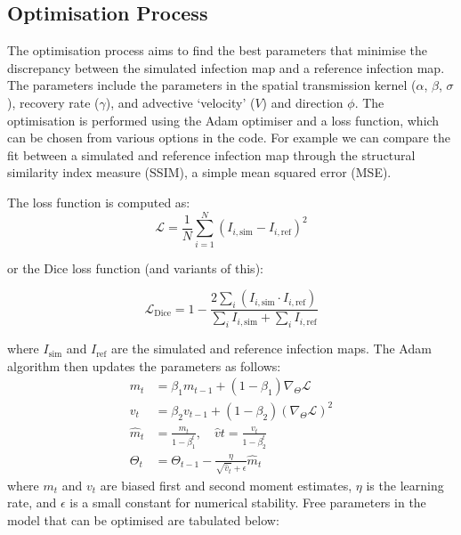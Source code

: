\documentclass[12pt]{article}
\begin{document}
\subsection{Optimisation Process}
The optimisation process aims to find the best parameters that minimise the discrepancy between the simulated infection map and a reference infection map. The parameters include the parameters in the spatial transmission  kernel ($\alpha$, $\beta$, $\sigma$), recovery rate ($\gamma$), and advective `velocity' ($V$) and direction $\phi$. The optimisation is performed using the Adam optimiser and a loss function, which can be chosen from various options in the code. For example we can compare the fit between a simulated and reference infection map through the structural similarity index measure (SSIM),  a simple mean squared error (MSE).

The loss function is computed as:
\[
\mathcal{L}= \frac{1}{N} \sum_{i=1}^{N} (I_{i, \text{sim}} - I_{i, \text{ref}})^2
\]

or the Dice loss function (and variants of this):

\[
\mathcal{L}_{\text{Dice}} = 1 - \frac{2 \sum_{i} (I_{i, \text{sim}} \cdot I_{i, \text{ref}})}{\sum_{i} I_{i, \text{sim}} + \sum_{i} I_{i, \text{ref}}}
\]


where $I_{\text{sim}}$ and $I_{\text{ref}}$ are the simulated and reference infection maps. The Adam algorithm then updates the parameters as follows:
\begin{align*}
m_t &= \beta_1 m_{t-1} + (1 - \beta_1) \nabla_\Theta \mathcal{L} \\
v_t &= \beta_2 v_{t-1} + (1 - \beta_2) (\nabla_\Theta \mathcal{L})^2 \\
\hat{m}_t &= \frac{m_t}{1 - \beta_1^t}, \quad \hat{v}t = \frac{v_t}{1 - \beta_2^t} \\
\Theta_t &= \Theta_{t-1} - \frac{\eta}{\sqrt{\hat{v}_t} + \epsilon} \hat{m}_t
\end{align*}
where $m_t$ and $v_t$ are biased first and second moment estimates, $\eta$ is the learning rate, and $\epsilon$ is a small constant for numerical stability. Free parameters in the model that can be optimised are tabulated below:
\end{document}
